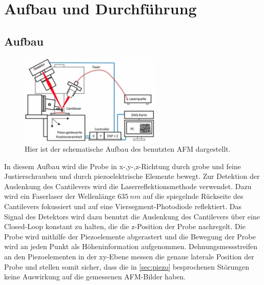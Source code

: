 \section{Aufbau und Durchführung}
\subsection{Aufbau}
\label{sec:Aufbau}
    \begin{figure}[ht]
        \centering\captionsetup{format=plain}
        \includegraphics[width=0.6\textwidth]{bilder/Aufbau.png}
        \caption{Hier ist der schematische Aufbau des benutzten AFM dargestellt.}
        \label{fig:Aufbau}
    \end{figure}
    In diesem Aufbau wird die Probe in x-,y-,z-Richtung durch grobe und feine Justierschrauben und durch piezoelektrische Elemente bewegt.
    Zur Detektion der Auslenkung des Cantilevers wird die Laserreflektionsmethode verwendet.
    Dazu wird ein Faserlaser der Wellenlänge $\SI{635}{nm}$ auf die spiegelnde Rückseite des Cantilevers fokussiert und auf eine Viersegment-Photodiode reflektiert.
    Das Signal des Detektors wird dazu benutzt die Auslenkung des Cantilevers über eine Closed-Loop konstant zu halten, die die z-Position der Probe nachregelt.
    Die Probe wird mithilfe der Piezoelemente abgerastert und die Bewegung der Probe wird an jeden Punkt als Höheninformation aufgenommen.
    Dehnungsmessstreifen an den Piezoelementen in der xy-Ebene messen die genaue laterale Position der Probe und stellen somit sicher, dass die in \autoref{sec:piezo} besprochenen Störungen keine Auswirkung auf die gemessenen AFM-Bilder haben.

